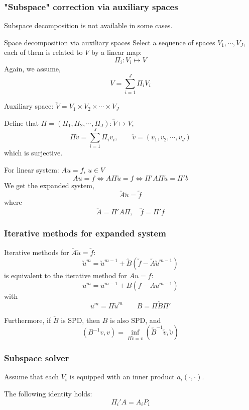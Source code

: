\begin{frame}
\frametitle{"Subspace" correction via auxiliary spaces}
Subspace decomposition is not available in some cases.
\begin{block}{Space decomposition via auxiliary spaces}
Select a sequence of spaces $V_1, \cdots, V_J$, each of them is related to $V$ by a linear map:
$$\Pi_i: V_i \mapsto V$$
Again, we assume, 
$$V=\sum_{i=1}^J\Pi_i V_i$$
\end{block}
\end{frame}

\begin{frame}
Auxiliary space: $\utilde{V}=V_1\times V_2 \times \cdots \times V_{J}$

Define that $\Pi=(\Pi_1,\Pi_2,\cdots,\Pi_{J}):\utilde{V}\mapsto V$,
$$\Pi \utilde{v}=\sum_{i=1}^{J}\Pi_i v_i,\qquad
\utilde{v}=(v_1,v_2,\cdots,v_J)$$
which is surjective.

For linear system: $Au=f$, $u \in V$ 
$$Au=f \Longleftrightarrow 
A\Pi\utilde{u}=f \Longleftrightarrow 
\Pi'A\Pi\utilde{u}=\Pi'b
$$
We get the expanded system,
$$\utilde{A}\utilde{u}=\utilde{f}$$
where
$$\utilde{A}=\Pi'A\Pi,\quad\utilde{f}=\Pi'f$$
\end{frame}

\begin{frame}
\frametitle{Iterative methods for expanded system}
\begin{theorem}
Iterative methods for $\utilde{A}\utilde{u}=\utilde{f}$:
$$\utilde{u}^m=\utilde{u}^{m-1}+\utilde{B}
(\utilde{f}-\utilde{A}\utilde{u}^{m-1})$$
is equivalent to the iterative method for $Au=f$:
$${u}^m={u}^{m-1}+{B}({f}-{A}{u}^{m-1})$$
with
$$u^m=\Pi \utilde{u}^m\qquad B=\Pi \utilde{B} \Pi'$$
\end{theorem}
Furthermore, if $\utilde{B}$ is SPD, then 
$B$ is also SPD, and 
$$(B^{-1}v,v)=
\inf_{\Pi\utilde{v}=v}(\utilde{B}^{-1}\utilde{v},\utilde{v})$$
\end{frame}

\begin{frame}
\frametitle{Subspace solver}
Assume that each $V_i$ is equipped with an inner product
$a_i(\cdot,\cdot)$.

\begin{figure}[ht]
\end{figure}
The following identity holds:
$$\Pi_i'A=A_iP_i$$
\end{frame}

